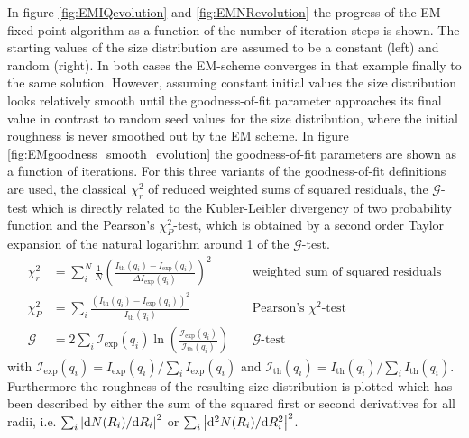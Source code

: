 In figure \ref{fig:EMIQevolution} and \ref{fig:EMNRevolution} the progress of the EM-fixed point algorithm as a function of the number of iteration steps is shown. The starting values of the size distribution are assumed to be a constant (left) and random (right). In both cases the EM-scheme converges in that example finally to the same solution. However, assuming constant initial values the size distribution looks relatively smooth until the goodness-of-fit parameter approaches its final value in contrast to random seed values for the size distribution, where the initial roughness is never smoothed out by the EM scheme. In figure \ref{fig:EMgoodness_smooth_evolution} the goodness-of-fit parameters are shown as a function of iterations. For this three variants of the goodness-of-fit definitions are used, the classical $\chi_r^2$ of reduced weighted sums of squared  residuals, the $\mathcal{G}$-test which is directly related to the Kubler-Leibler divergency of two probability function and the Pearson's $\chi_P^2$-test, which is obtained by a second order Taylor expansion of the natural logarithm around 1 of the  $\mathcal{G}$-test.
\begin{align}
  \chi_r^2 &= \sum_i^N \frac{1}{N}\left(\frac{I_\mathrm{th}(q_i)-I_\mathrm{exp}(q_i)}{\Delta I_\mathrm{exp}(q_i)}\right)^2 &~ &\mbox{weighted sum of squared residuals} \label{eq:goodnessoffit_chi2}\\
  \chi_P^2 &= \sum_i \frac{\left(I_\mathrm{th}(q_i)-I_\mathrm{exp}(q_i)\right)^2}{I_\mathrm{th}(q_i)} &~ &\mbox{Pearson's $\chi^2$-test} \label{eq:goodnessoffit_chi2test}\\
  \mathcal{G} &= 2\sum_i \mathcal{I}_\mathrm{exp}(q_i)\ln\left(\frac{\mathcal{I}_\mathrm{exp}(q_i)}{\mathcal{I}_\mathrm{th}(q_i)}\right) &~ & \mathcal{G}\mbox{-test} \label{eq:goodnessoffit_Gtest}
\end{align}
with $\mathcal{I}_\mathrm{exp}(q_i)=I_\mathrm{exp}(q_i)/\sum_i I_\mathrm{exp}(q_i)$ and $\mathcal{I}_\mathrm{th}(q_i)=I_\mathrm{th}(q_i)/\sum_i I_\mathrm{th}(q_i)$.
Furthermore the roughness of the resulting size distribution is plotted which has been described by either the sum of the squared first or second derivatives for all radii, i.e. $\sum_i \abs{\mathrm{d}N(R_i)/\mathrm{d}R_i}^2$ or $\sum_i \abs{\mathrm{d}^2N(R_i)/\mathrm{d}R_i^2}^2$.
